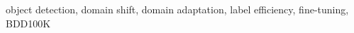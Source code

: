 \documentclass[conference]{IEEEtran}
\begin{document}
\begin{IEEEkeywords}
object detection, domain shift, domain adaptation, label efficiency, fine-tuning, BDD100K
\end{IEEEkeywords}







\appendices




\end{document}
